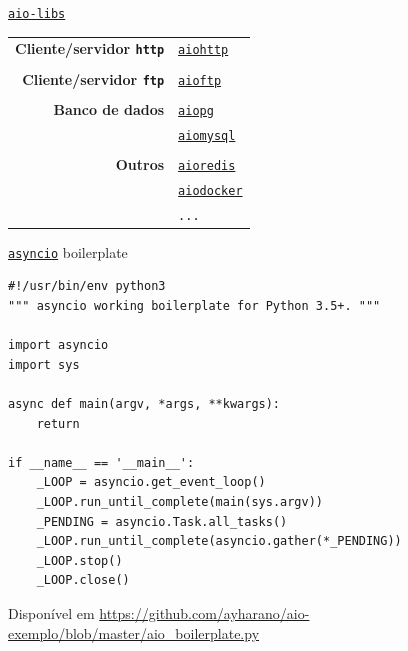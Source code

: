 \documentclass[12pt]{beamer}
\begin{document}
\begin{frame}[fragile]{\texttt{\href{https://github.com/aio-libs}{aio-libs}}}
  \begin{table} 
    \vspace{-0.25cm}
    \begin{tabular}{rl}
      \textbf{Cliente/servidor \texttt{http}} & 
      \texttt{\href{https://github.com/aio-libs/aiohttp}{aiohttp}} \\
      & \\
      \textbf{Cliente/servidor \texttt{ftp}} &
      \texttt{\href{https://github.com/aio-libs/aioftp}{aioftp}} \\
      & \\
      \textbf{Banco de dados} &
      \texttt{\href{https://github.com/aio-libs/aiopg}{aiopg}} \\
      &
      \texttt{\href{https://github.com/aio-libs/aiomysql}{aiomysql}} \\
      & \\
      \textbf{Outros} &
      \texttt{\href{https://github.com/aio-libs/aioredis}{aioredis}} \\
      &
      \texttt{\href{https://github.com/aio-libs/aiodocker}{aiodocker}} \\
      &
      \texttt{...} \\
    \end{tabular}
  \end{table}
\end{frame}

\begin{frame}[fragile]{\texttt{\href{https://docs.python.org/3/library/asyncio.html}{asyncio}} boilerplate}
  \scriptsize{\vspace{-0.25cm}
              \begin{verbatim}#!/usr/bin/env python3
""" asyncio working boilerplate for Python 3.5+. """

import asyncio
import sys

async def main(argv, *args, **kwargs):
    return

if __name__ == '__main__':
    _LOOP = asyncio.get_event_loop()
    _LOOP.run_until_complete(main(sys.argv))
    _PENDING = asyncio.Task.all_tasks()
    _LOOP.run_until_complete(asyncio.gather(*_PENDING))
    _LOOP.stop()
    _LOOP.close()\end{verbatim}}
  \begin{flushright}
    \tiny{\vspace{-0.25cm}
          Disponível em \url{https://github.com/ayharano/aio-exemplo/blob/master/aio\_boilerplate.py}}
  \end{flushright}
\end{frame}
\end{document}
